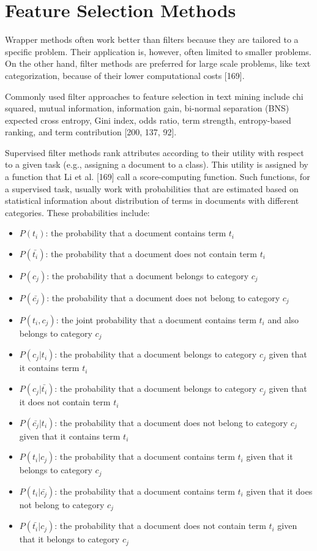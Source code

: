 \documentclass[11pt,openany,executivepaper]{book}
\begin{document}
\section{Feature Selection Methods}
Wrapper methods often work better than filters because they are tailored to a specific problem. Their application is, however, often limited to smaller problems. On the other hand, filter methods are preferred for large scale problems, like text categorization, because of their lower computational costs [169].

Commonly used filter approaches to feature selection in text mining include chi squared, mutual information, information gain, bi-normal separation (BNS) expected cross entropy, Gini index, odds ratio, term strength, entropy-based ranking, and term contribution [200, 137, 92].

Supervised filter methods rank attributes according to their utility with respect to a given task (e.g., assigning a document to a class). This utility is assigned by a function that Li et al. [169] call a score-computing function. Such functions, for a supervised task, usually work with probabilities that are estimated based on statistical information about distribution of terms in documents
with different categories. These probabilities include:

\begin{itemize}
    \item $P(t_i)$: the probability that a document contains term $t_i$
    \item $P(\bar{t_i})$: the probability that a document does not contain term $t_i$
    \item $P(c_j)$: the probability that a document belongs to category $c_j$
    \item $P(\bar{c_j})$: the probability that a document does not belong to category $c_j$
    \item $P(t_i, c_j)$: the joint probability that a document contains term $t_i$ and also belongs to category $c_j$
    \item $P(c_j|t_i)$: the probability that a document belongs to category $c_j$ given that it contains term $t_i$
    \item $P(c_j|\bar{t_i})$: the probability that a document belongs to category $c_j$ given that it does not contain term $t_i$
    \item $P(\bar{c_j}|t_i)$: the probability that a document does not belong to category $c_j$ given that it contains term $t_i$
    \item $P(t_i|c_j)$: the probability that a document contains term $t_i$ given that it belongs to category $c_j$
    \item $P(t_i|\bar{c_j})$: the probability that a document contains term $t_i$ given that it does not belong to category $c_j$
    \item $P(\bar{t_i}|c_j)$: the probability that a document does not contain term $t_i$ given that it belongs to category $c_j$
\end{itemize}
\end{document}
